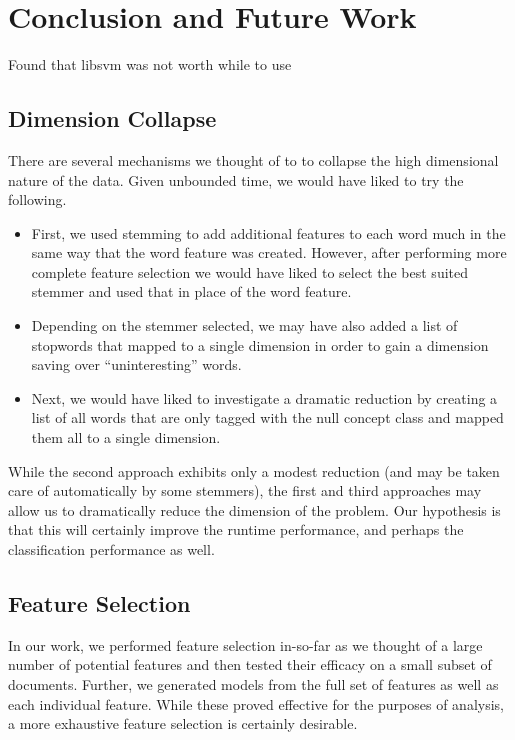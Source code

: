 \documentclass[preprint]{style}
\begin{document}
\section{Conclusion and Future Work}


Found that libsvm was not worth while to use

\subsection{Dimension Collapse}
There are several mechanisms we thought of to to collapse the high dimensional nature of the data. Given unbounded time, we would have liked to try the following.

\begin{itemize}
\item First, we used stemming to add additional features to each word much in the same way that the word feature was created. However, after performing more complete feature selection we would have liked to select the best suited stemmer and used that in place of the word feature.

\item Depending on the stemmer selected, we may have also added a list of stopwords that mapped to a single dimension in order to gain a dimension saving over ``uninteresting'' words.

\item Next, we would have liked to investigate a dramatic reduction by creating a list of all words that are only tagged with the null concept class and mapped them all to a single dimension.
\end{itemize}

While the second approach exhibits only a modest reduction (and may be taken care of automatically by some stemmers), the first and third approaches may allow us to dramatically reduce the dimension of the problem. Our hypothesis is that this will certainly improve the runtime performance, and perhaps the classification performance as well.

\subsection{Feature Selection}
In our work, we performed feature selection in-so-far as we thought of a large number of potential features and then tested their efficacy on a small subset of documents. Further, we generated models from the full set of features as well as each individual feature. While these proved effective for the purposes of analysis, a more exhaustive feature selection is certainly desirable. 
\end{document}
